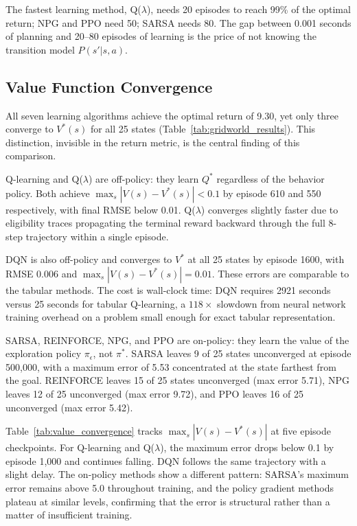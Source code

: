 The fastest learning method, Q($\lambda$), needs 20 episodes to reach 99\% of the optimal return; NPG and PPO need 50; SARSA needs 80. The gap between 0.001 seconds of planning and 20--80 episodes of learning is the price of not knowing the transition model $P(s'|s,a)$.


\subsection{Value Function Convergence}
\label{sec:illustrated_convergence}

All seven learning algorithms achieve the optimal return of 9.30, yet only three converge to $V^*(s)$ for all 25 states (Table~\ref{tab:gridworld_results}). This distinction, invisible in the return metric, is the central finding of this comparison.

Q-learning and Q($\lambda$) are off-policy: they learn $Q^*$ regardless of the behavior policy. Both achieve $\max_s |V(s) - V^*(s)| < 0.1$ by episode 610 and 550 respectively, with final RMSE below 0.01. Q($\lambda$) converges slightly faster due to eligibility traces propagating the terminal reward backward through the full 8-step trajectory within a single episode.

DQN is also off-policy and converges to $V^*$ at all 25 states by episode 1600, with RMSE 0.006 and $\max_s |V(s) - V^*(s)| = 0.01$. These errors are comparable to the tabular methods. The cost is wall-clock time: DQN requires 2921 seconds versus 25 seconds for tabular Q-learning, a $118\times$ slowdown from neural network training overhead on a problem small enough for exact tabular representation.

SARSA, REINFORCE, NPG, and PPO are on-policy: they learn the value of the exploration policy $\pi_\epsilon$, not $\pi^*$. SARSA leaves 9 of 25 states unconverged at episode 500,000, with a maximum error of 5.53 concentrated at the state farthest from the goal. REINFORCE leaves 15 of 25 states unconverged (max error 5.71), NPG leaves 12 of 25 unconverged (max error 9.72), and PPO leaves 16 of 25 unconverged (max error 5.42).

Table~\ref{tab:value_convergence} tracks $\max_s |V(s) - V^*(s)|$ at five episode checkpoints. For Q-learning and Q($\lambda$), the maximum error drops below 0.1 by episode 1,000 and continues falling. DQN follows the same trajectory with a slight delay. The on-policy methods show a different pattern: SARSA's maximum error remains above 5.0 throughout training, and the policy gradient methods plateau at similar levels, confirming that the error is structural rather than a matter of insufficient training.

